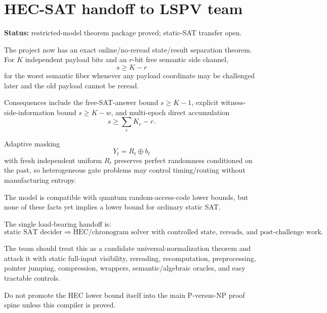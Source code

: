 \documentclass[11pt]{article}
\begin{document}
\section*{HEC-SAT handoff to LSPV team}
\textbf{Status:} restricted-model theorem package proved; static-SAT transfer open.

The project now has an exact online/no-reread state/result separation theorem. For $K$ independent payload bits and an $r$-bit free semantic side channel,
\[
\boxed{s\ge K-r}
\]
for the worst semantic fiber whenever any payload coordinate may be challenged later and the old payload cannot be reread.

Consequences include the free-SAT-answer bound $s\ge K-1$, explicit witness-side-information bound $s\ge K-w$, and multi-epoch direct accumulation
\[
s\ge \sum_e K_e-r.
\]

Adaptive masking
\[
Y_t=R_t\oplus b_t
\]
with fresh independent uniform $R_t$ preserves perfect randomness conditioned on the past, so heterogeneous gate problems may control timing/routing without manufacturing entropy.

The model is compatible with quantum random-access-code lower bounds, but none of these facts yet implies a lower bound for ordinary static SAT.

The single load-bearing handoff is:
\[
\boxed{
\text{static SAT decider}
\Longrightarrow
\text{HEC/chronogram solver with controlled state, rereads, and post-challenge work}.
}
\]

The team should treat this as a candidate universal-normalization theorem and attack it with static full-input visibility, rereading, recomputation, preprocessing, pointer jumping, compression, wrappers, semantic/algebraic oracles, and easy tractable controls.

Do not promote the HEC lower bound itself into the main P-versus-NP proof spine unless this compiler is proved.
\end{document}
